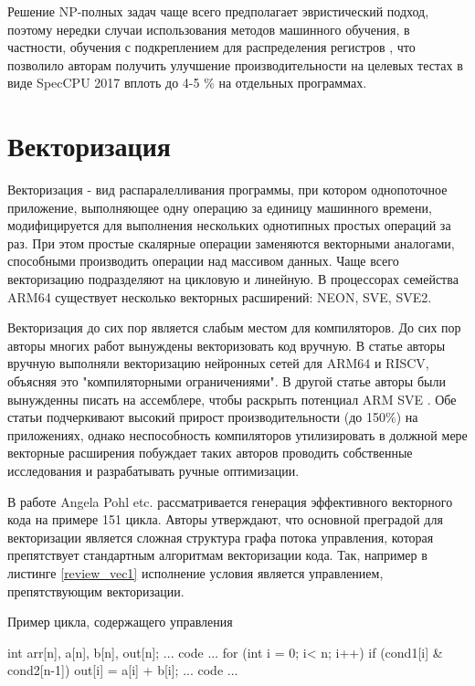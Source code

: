 Решение  NP-полных задач чаще всего предполагает эвристический подход, поэтому нередки случаи использования методов машинного обучения, в частности, обучения с подкреплением для распределения регистров \cite{venkatakeerthy2023rl4real}, что позволило авторам получить улучшение производительности на целевых тестах в виде SpecCPU 2017 вплоть до 4-5 \% на отдельных программах.


\section{Векторизация} \label{pr:vectorization}
Векторизация - вид распаралелливания программы, при котором однопоточное приложение, выполняющее одну операцию за единицу машинного времени, модифицируется для выполнения нескольких однотипных простых операций за раз. При этом простые скалярные операции заменяются векторными аналогами, способными производить операции над массивом данных. Чаще всего векторизацию подразделяют на цикловую и линейную. \cite{pohl2018control} В процессорах семейства ARM64 существует несколько векторных расширений: NEON, SVE, SVE2. 

Векторизация до сих пор является слабым местом для компиляторов. До сих пор  авторы многих работ вынуждены векторизовать код вручную. В статье \cite{cococcioni2021vectorizing} авторы вручную выполняли векторизацию нейронных сетей для ARM64 и RISCV, объясняя это "компиляторными ограничениями". В другой статье авторы были вынужденны писать на ассемблере, чтобы раскрыть потенциал ARM SVE \cite{armejach2020using}. Обе статьи подчеркивают высокий прирост производительности (до 150\%) на приложениях, однако неспособность компиляторов утилизировать в должной мере векторные расширения побуждает таких авторов проводить собственные исследования и разрабатывать ручные оптимизации.

В работе Angela Pohl etc. \cite{pohl2018control} рассматривается генерация эффективного векторного кода на примере 151 цикла. Авторы утверждают, что основной  преградой для векторизации является сложная структура графа потока управления, которая препятствует стандартным алгоритмам векторизации кода. 
 Так, например в  листинге \ref{review_vec1} исполнение условия является управлением, препятствующим векторизации. 
  \begin{ListingEnv}[!h]
 	\captiondelim{ } %
 	\caption{Пример цикла, содержащего управления}\label{review_vec1}
 	
 	\begin{Verb}
 		int arr[n], a[n],  b[n], out[n];
 		... code ...
 		for (int i = 0; i< n; i++) {
 			if (cond1[i] & cond2[n-1]){
 				out[i] = a[i] + b[i];  
 			}
 		}
 		... code ...
 	\end{Verb}
 \end{ListingEnv}
 
